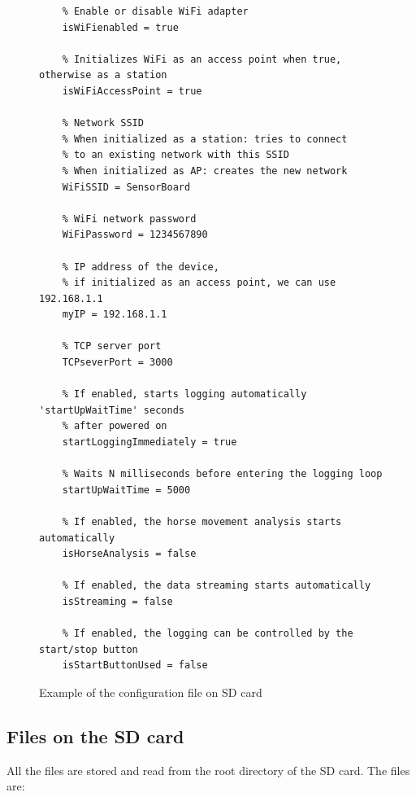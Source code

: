 \begin{figure}
	\centering
	\label{SBconfigFile}
	\caption{Example of the configuration file on SD card}
	\begin{verbatim}
	% Enable or disable WiFi adapter
	isWiFienabled = true
	
	% Initializes WiFi as an access point when true, otherwise as a station
	isWiFiAccessPoint = true
	
	% Network SSID
	% When initialized as a station: tries to connect
	% to an existing network with this SSID
	% When initialized as AP: creates the new network
	WiFiSSID = SensorBoard
	
	% WiFi network password
	WiFiPassword = 1234567890
	
	% IP address of the device,
	% if initialized as an access point, we can use 192.168.1.1
	myIP = 192.168.1.1
	
	% TCP server port
	TCPseverPort = 3000
	
	% If enabled, starts logging automatically 'startUpWaitTime' seconds
	% after powered on
	startLoggingImmediately = true
	
	% Waits N milliseconds before entering the logging loop
	startUpWaitTime = 5000
	
	% If enabled, the horse movement analysis starts automatically
	isHorseAnalysis = false
	
	% If enabled, the data streaming starts automatically
	isStreaming = false
	
	% If enabled, the logging can be controlled by the start/stop button
	isStartButtonUsed = false
	\end{verbatim}
\end{figure}

\subsection{Files on the SD card}
All the files are stored and read from the root directory of the SD card. The files are:

